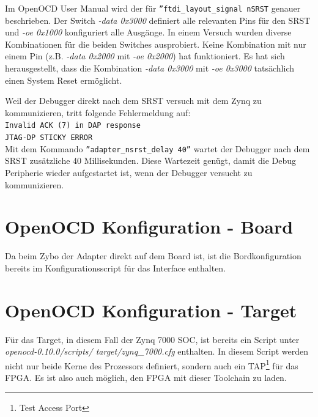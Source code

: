 Im OpenOCD User Manual\cite{bib:OpenOCDDoku} wird der für \texttt{''ftdi\_layout\_signal nSRST} genauer beschrieben.
Der Switch \textit{-data 0x3000} definiert alle relevanten Pins für den SRST und \textit{-oe 0x1000} konfiguriert alle Ausgänge.
In einem Versuch wurden diverse Kombinationen für die beiden Switches ausprobiert.
Keine Kombination mit nur einem Pin (z.B. \textit{-data 0x2000} mit \textit{-oe 0x2000}) hat funktioniert.
Es hat sich herausgestellt, dass die Kombination \textit{-data 0x3000} mit \textit{-oe 0x3000} tatsächlich einen System Reset ermöglicht.

Weil der Debugger direkt nach dem SRST versuch mit dem Zynq zu kommunizieren, tritt folgende Fehlermeldung auf:\\
\texttt{Invalid ACK (7) in DAP response\\
JTAG-DP STICKY ERROR}\\
Mit dem Kommando \texttt{''adapter\_nsrst\_delay 40''} wartet der Debugger nach dem SRST zusätzliche 40 Millisekunden.
Diese Wartezeit genügt, damit die Debug Peripherie wieder aufgestartet ist, wenn der Debugger versucht zu kommunizieren.



\section{OpenOCD Konfiguration - Board}
Da beim Zybo der Adapter direkt auf dem Board ist, ist die Bordkonfiguration bereits im Konfigurationsscript für das Interface enthalten.

\section{OpenOCD Konfiguration - Target}
Für das Target, in diesem Fall der Zynq 7000 SOC, ist bereits ein Script unter \textit{openocd-0.10.0/scripts/ target/zynq\_7000.cfg} enthalten.
In diesem Script werden nicht nur beide Kerne des Prozessors definiert, sondern auch ein TAP\footnote{Test Access Port} für das FPGA.
Es ist also auch möglich, den FPGA mit dieser Toolchain zu laden.
